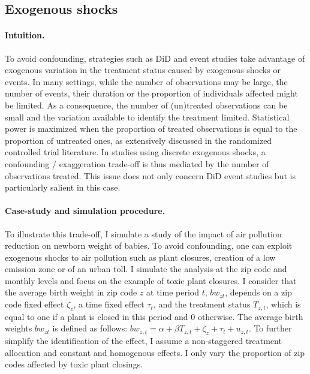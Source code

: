\documentclass[usletter, 12pt]{article}
\begin{document}




		\subsection{Exogenous shocks}\label{sim_shocks}
    
        			\paragraph{Intuition.}  To avoid confounding, strategies such as DiD and event studies take advantage of exogenous variation in the treatment status caused by exogenous shocks or events. In many settings, while the number of observations may be large, the number of events, their duration or the proportion of individuals affected might be limited. As a consequence, the number of (un)treated observations can be small and the variation available to identify the treatment limited. Statistical power is maximized when the proportion of treated observations is equal to the proportion of untreated ones, as extensively discussed in the randomized controlled trial literature. In studies using discrete exogenous shocks, a confounding / exaggeration trade-off is thus mediated by the number of observations treated. This issue does not only concern DiD event studies but is particularly salient in this case. 
			
			\paragraph{Case-study and simulation procedure.} %
			To illustrate this trade-off, I simulate a study of the impact of air pollution reduction on newborn weight of babies. To avoid confounding, one can exploit exogenous shocks to air pollution such as plant closures, creation of a low emission zone or of an urban toll. I simulate the analysis at the zip code and monthly levels and focus on the example of toxic plant closures. I consider that the average birth weight in zip code $z$ at time period $t$, $bw_{zt}$, depends on a zip code fixed effect $\zeta_z$, a time fixed effect $\tau_t$, and the treatment status $T_{z,t}$, which is equal to one if a plant is closed in this period and 0 otherwise. The average birth weights $bw_{zt}$ is defined as follows: $bw_{z,t} = \alpha + \beta T_{z, t} + \zeta_z + \tau_t + u_{z,t}$. To further simplify the identification of the effect, I assume a non-staggered treatment allocation and constant and homogenous effects. I only vary the proportion of zip codes affected by toxic plant closings.
\end{document}
